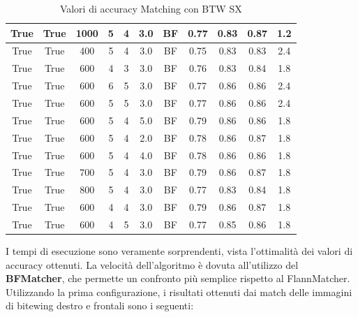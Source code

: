\documentclass[12pt,a4paper,openright,twoside]{book}
\begin{document}
\begin{table}[H]
{\begin{tabular}{|c|c|c|c|c|c|c|c|c|c|c|}
    \hline
    True & True & 1000 & 5 & 4 & 3.0 & BF & 0.77 & 0.83 & 0.87 & 1.2\\
    \hline
    True & True & 400 & 5 & 4 & 3.0 & BF & 0.75 & 0.83 & 0.83 & 2.4\\
    \hline
    True & True & 600 & 4 & 3 & 3.0 & BF & 0.76 & 0.83 & 0.84 & 1.8\\
    \hline
    True & True & 600 & 6 & 5 & 3.0 & BF & 0.77 & 0.86 & 0.86 & 2.4\\
    \hline
    True & True & 600 & 5 & 5 & 3.0 & BF & 0.77 & 0.86 & 0.86 & 2.4\\
    \hline
    True & True & 600 & 5 & 4 & 5.0 & BF & 0.79 & 0.86 & 0.86 & 1.8\\
    \hline
    True & True & 600 & 5 & 4 & 2.0 & BF & 0.78 & 0.86 & 0.87 & 1.8\\
    \hline
    True & True & 600 & 5 & 4 & 4.0 & BF & 0.78 & 0.86 & 0.86 & 1.8\\
    \hline
    \rowcolor{yellow}
    True & True & 700 & 5 & 4 & 3.0 & BF & 0.79 & 0.86 & 0.87 & 1.8\\
    \hline
    True & True & 800 & 5 & 4 & 3.0 & BF & 0.77 & 0.83 & 0.84 & 1.8\\
    \hline
    \rowcolor{yellow}
    True & True & 600 & 4 & 4 & 3.0 & BF & 0.79 & 0.86 & 0.87 & 1.8\\
    \hline
    True & True & 600 & 4 & 5 & 3.0 & BF & 0.77 & 0.85 & 0.86 & 1.8\\
    \hline
\end{tabular}%
}
\caption{Valori di accuracy Matching con BTW SX}
    \label{tab:accsx}
\end{table}


I tempi di esecuzione sono veramente sorprendenti, vista l'ottimalità dei valori di accuracy ottenuti. La velocità dell'algoritmo è dovuta all'utilizzo del \textbf{BFMatcher}, che permette un confronto più semplice rispetto al FlannMatcher.\\
Utilizzando la prima configurazione, i risultati ottenuti dai match delle immagini di bitewing destro e frontali sono i seguenti:
\end{document}
